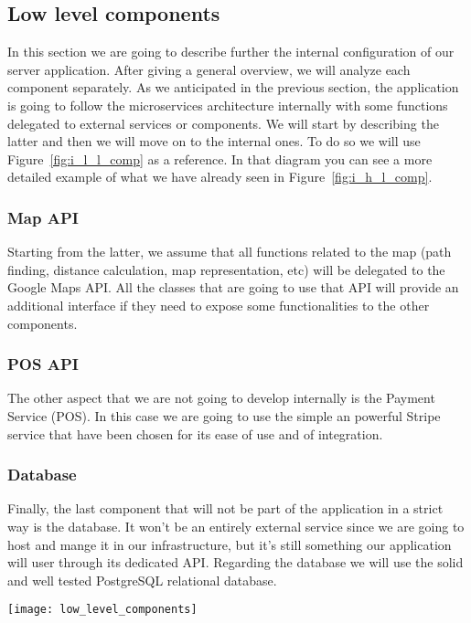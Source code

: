 \pagebreak
\subsection{Low level components}
In this section we are going to describe further the internal configuration of our server
application. After giving a general overview, we will analyze each component separately.
As we anticipated in the previous section, the application is going to follow the microservices
architecture internally with some functions delegated to external services or components.
We will start by describing the latter and then we will move on to the internal ones.
To do so we will use Figure~\ref{fig:i_l_l_comp} as a reference.
In that diagram you can see a more detailed example of what we have already seen
in Figure~\ref{fig:i_h_l_comp}.

\subsubsection{Map API}
Starting from the latter, we assume that all functions related to the map (path finding,
distance calculation, map representation, etc) will be delegated to the Google Maps API.
All the classes that are going to use that API will provide an additional interface if they 
need to expose some functionalities to the other components.
\subsubsection{POS API}
The other aspect that we are not going to develop internally is the Payment Service (POS).
In this case we are going to use the simple an powerful Stripe service that have been chosen
for its ease of use and of integration.
\subsubsection{Database}
Finally, the last component that will not be part of the application in a strict way is the database.
It won't be an entirely external service since we are going to host and mange it in our infrastructure,
but it's still something our application will user through its dedicated API. Regarding the
database we will use the solid and well tested PostgreSQL relational database.

\begin{sidewaysfigure}
\centering
\texttt{[image: low\_level\_components]}
\caption{Component view: Internal Low Level Architecture}
\label{fig:i_l_l_comp}
\end{sidewaysfigure}

